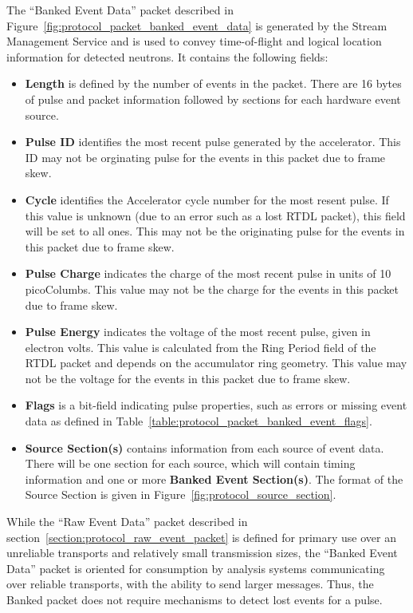 The ``Banked Event Data'' packet described in
Figure~\ref{fig:protocol_packet_banked_event_data} is generated by the
Stream Management Service and is used to convey time-of-flight and logical
location information for detected neutrons. It contains the following fields:
\begin{itemize}
\item{\bf Length} is defined by the number of events in the packet. There
are 16 bytes of pulse and packet information followed by sections for each
hardware event source.
\item{\bf Pulse ID} identifies the most recent pulse generated by the
accelerator. This ID may not be orginating pulse for the events in this packet
due to frame skew.
\item{\bf Cycle} identifies the Accelerator cycle number for the most
resent pulse. If this value is unknown (due to an error such as a lost RTDL
packet), this field will be set to all ones. This may not be the originating
pulse for the events in this packet due to frame skew.
\item{\bf Pulse Charge} indicates the charge of the most recent pulse in units
of 10 picoColumbs. This value may not be the charge for the events in this
packet due to frame skew.
\item{\bf Pulse Energy} indicates the voltage of the most recent pulse,
given in electron volts. This value is calculated from the Ring Period
field of the RTDL packet and depends on the accumulator ring geometry. This
value may not be the voltage for the events in this packet due to frame skew.
\item{\bf Flags} is a bit-field indicating pulse properties, such as errors or
missing event data as defined in
Table~\ref{table:protocol_packet_banked_event_flags}.
\item{\bf Source Section(s)} contains information from each source of event
data. There will be one section for each source, which will contain timing
information and one or more {\bf Banked Event Section(s)}. The format of the
Source Section is given in Figure~\ref{fig:protocol_source_section}.
\end{itemize}

While the ``Raw Event Data'' packet described in
section~\ref{section:protocol_raw_event_packet} is defined for primary use over
an unreliable transports and relatively small transmission sizes, the ``Banked
Event Data'' packet is oriented for consumption by analysis systems
communicating over reliable transports, with the ability to send larger
messages. Thus, the Banked packet does not require mechanisms to detect lost
events for a pulse.

